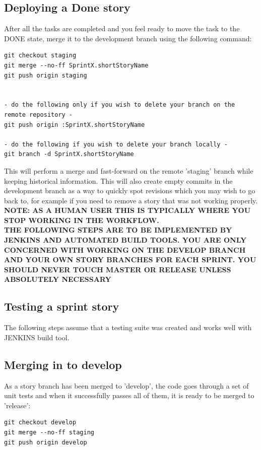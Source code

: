 \documentclass[11pt]{report}
\begin{document}
\subsection{Deploying a Done story}

After all the tasks are completed and you feel ready to move the task to the DONE state, merge it to the development branch using the following command:\\

\begin{verbatim}
git checkout staging
git merge --no-ff SprintX.shortStoryName
git push origin staging


- do the following only if you wish to delete your branch on the remote repository -
git push origin :SprintX.shortStoryName

- do the following if you wish to delete your branch locally -  
git branch -d SprintX.shortStoryName
\end{verbatim}
This will perform a merge and fast-forward on the remote 'staging' branch while keeping historical information.
This will also create empty commits in the development branch as a way to quickly spot revisions which you may wish to go back to, for example if you need to remove a story that was not working properly.
\newpage
\textbf {NOTE: AS A HUMAN USER THIS IS TYPICALLY WHERE YOU STOP WORKING IN THE WORKFLOW. \\THE FOLLOWING STEPS ARE TO BE IMPLEMENTED BY JENKINS AND AUTOMATED BUILD TOOLS. YOU ARE ONLY CONCERNED WITH WORKING ON THE DEVELOP BRANCH AND YOUR OWN STORY BRANCHES FOR EACH SPRINT. YOU SHOULD NEVER TOUCH MASTER OR RELEASE UNLESS ABSOLUTELY NECESSARY}

\subsection{Testing a sprint story}

The following steps assume that a testing suite was created and works well with JENKINS build tool. 

\subsection{Merging in to develop}
As a story branch has been merged to 'develop', the code goes through a set of unit tests and when it successfully passes all of them, it is ready to be merged to 'release': 
\begin{verbatim}
git checkout develop
git merge --no-ff staging
git push origin develop
\end{verbatim}
\end{document}
